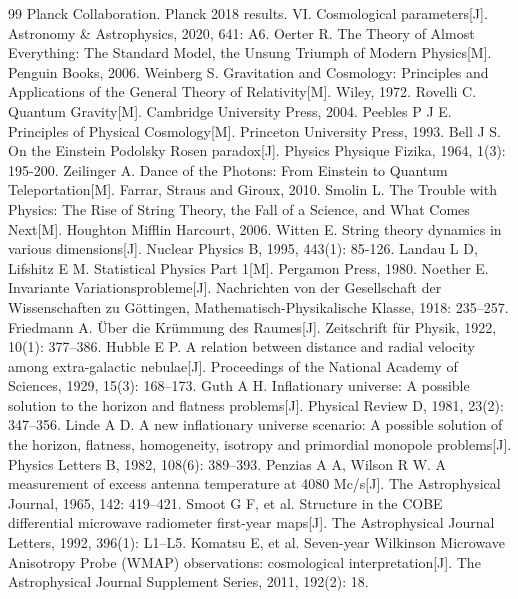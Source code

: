 \documentclass[12pt,a4paper]{article}
\begin{document}
\begin{thebibliography}{99}
 Planck Collaboration. Planck 2018 results. VI. Cosmological parameters[J]. Astronomy \& Astrophysics, 2020, 641: A6.
 Oerter R. The Theory of Almost Everything: The Standard Model, the Unsung Triumph of Modern Physics[M]. Penguin Books, 2006.
 Weinberg S. Gravitation and Cosmology: Principles and Applications of the General Theory of Relativity[M]. Wiley, 1972.
 Rovelli C. Quantum Gravity[M]. Cambridge University Press, 2004.
 Peebles P J E. Principles of Physical Cosmology[M]. Princeton University Press, 1993.
 Bell J S. On the Einstein Podolsky Rosen paradox[J]. Physics Physique Fizika, 1964, 1(3): 195-200.
 Zeilinger A. Dance of the Photons: From Einstein to Quantum Teleportation[M]. Farrar, Straus and Giroux, 2010.
 Smolin L. The Trouble with Physics: The Rise of String Theory, the Fall of a Science, and What Comes Next[M]. Houghton Mifflin Harcourt, 2006.
 Witten E. String theory dynamics in various dimensions[J]. Nuclear Physics B, 1995, 443(1): 85-126.
 Landau L D, Lifshitz E M. Statistical Physics Part 1[M]. Pergamon Press, 1980.
 Noether E. Invariante Variationsprobleme[J]. Nachrichten von der Gesellschaft der Wissenschaften zu Göttingen, Mathematisch-Physikalische Klasse, 1918: 235–257.
 Friedmann A. Über die Krümmung des Raumes[J]. Zeitschrift für Physik, 1922, 10(1): 377–386.
 Hubble E P. A relation between distance and radial velocity among extra-galactic nebulae[J]. Proceedings of the National Academy of Sciences, 1929, 15(3): 168–173.
 Guth A H. Inflationary universe: A possible solution to the horizon and flatness problems[J]. Physical Review D, 1981, 23(2): 347–356.
 Linde A D. A new inflationary universe scenario: A possible solution of the horizon, flatness, homogeneity, isotropy and primordial monopole problems[J]. Physics Letters B, 1982, 108(6): 389–393.
 Penzias A A, Wilson R W. A measurement of excess antenna temperature at 4080 Mc/s[J]. The Astrophysical Journal, 1965, 142: 419–421.
 Smoot G F, et al. Structure in the COBE differential microwave radiometer first-year maps[J]. The Astrophysical Journal Letters, 1992, 396(1): L1–L5.
 Komatsu E, et al. Seven-year Wilkinson Microwave Anisotropy Probe (WMAP) observations: cosmological interpretation[J]. The Astrophysical Journal Supplement Series, 2011, 192(2): 18.

\end{thebibliography}
\end{document}
